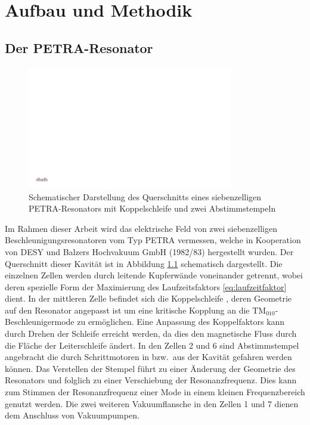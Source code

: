 \chapter{Aufbau und Methodik}
\label{sec:aufbau_und_methodik}


\section{Der PETRA-Resonator}
\begin{figure}[htb]
  \centering
  \includegraphics[width=0.8\textwidth]{./figs/cavity/cavity.pdf}
  \caption{Schematischer Darstellung des Querschnitts eines siebenzelligen PETRA-Resonators mit Koppelschleife und zwei Abstimmstempeln}
  \label{fig:petra_cavity}
\end{figure}
Im Rahmen dieser Arbeit wird das elektrische Feld von zwei siebenzelligen Beschleunigungsresonatoren vom Typ PETRA \cite{desy_petra} vermessen, welche in Kooperation von DESY und Balzers Hochvakuum GmbH (1982/83) hergestellt wurden.
Der Querschnitt dieser Kavität ist in Abbildung \ref{fig:petra_cavity} schematisch dargestellt.
Die einzelnen Zellen werden durch leitende Kupferwände voneinander getrennt, wobei deren spezielle Form der Maximierung des Laufzeitsfaktors \eqref{eq:laufzeitfaktor} dient.
In der mittleren Zelle befindet sich die Koppelschleife \cite{desy_schleife}, deren Geometrie auf den Resonator angepasst ist um eine kritische Kopplung an die $\mathrm{TM}_{010}$-Beschleunigermode zu ermöglichen.
Eine Anpassung des Koppelfaktors kann durch Drehen der Schleife erreicht werden, da dies den magnetische Fluss durch die Fläche der Leiterschleife ändert.
In den Zellen 2 und 6 sind Abstimmstempel \cite{desy_stempel} angebracht die durch Schrittmotoren in bzw.\ aus der Kavität gefahren werden können.
Das Verstellen der Stempel führt zu einer Änderung der Geometrie des Resonators und folglich zu einer Verschiebung der Resonanzfrequenz.
Dies kann zum Stimmen der Resonanzfrequenz einer Mode in einem kleinen Frequenzbereich genutzt werden.
Die zwei weiteren Vakuumflansche in den Zellen 1 und 7 dienen dem Anschluss von Vakuumpumpen.

